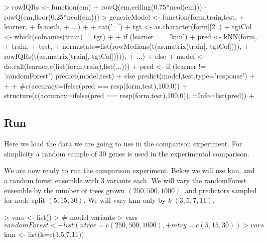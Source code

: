 \documentclass{article}
\begin{document}
\begin{Schunk}
\begin{Sinput}
> rowIQRs <- function(em) 
+   rowQ(em,ceiling(0.75*ncol(em))) - rowQ(em,floor(0.25*ncol(em)))
> genericModel <- function(form,train,test,
+                          learner,
+                          fs.meth,
+                          ...)
+ {
+   cat('=')
+   tgt <- as.character(form[[2]])
+   tgtCol <- which(colnames(train)==tgt)
+   
+   if (learner == 'knn') 
+     pred <- kNN(form,
+                 train,
+                 test,
+                 norm.stats=list(rowMedians(t(as.matrix(train[,-tgtCol]))),
+                                 rowIQRs(t(as.matrix(train[,-tgtCol])))),
+                 ...)
+   else {
+     model <- do.call(learner,c(list(form,train),list(...)))
+     pred <- if (learner != 'randomForest') predict(model,test)
+     else predict(model,test,type='response')
+   }
+   
+   #c(accuracy=ifelse(pred == resp(form,test),100,0))
+   structure(c(accuracy=ifelse(pred == resp(form,test),100,0)), itInfo=list(pred))
+ }
\end{Sinput}
\end{Schunk}

\subsection*{Run}
Here we load the data we are going to use in the comparison experiment. For simplicity a random sample of 30 genes is used in the experimental comparison. 

\begin{Schunk}
\end{Schunk}

We are now ready to run the comparison experiment. Below we will use knn, and a random forest ensemble with 3 variants each. We will vary the randomForest ensemble by the number of trees grown $(250, 500, 1000)$, and predictors sampled for node split $(5,15,30)$. We will vary knn only by {\it k} $(3,5,7,11)$.

\begin{Schunk}
\begin{Sinput}
> vars <- list()
> # model variants
> vars$randomForest <- list(ntree=c(250,500,1000),
+                           mtry=c(5,15,30))
> vars$knn <- list(k=c(3,5,7,11))
\end{Sinput}
\end{Schunk}
\end{document}
